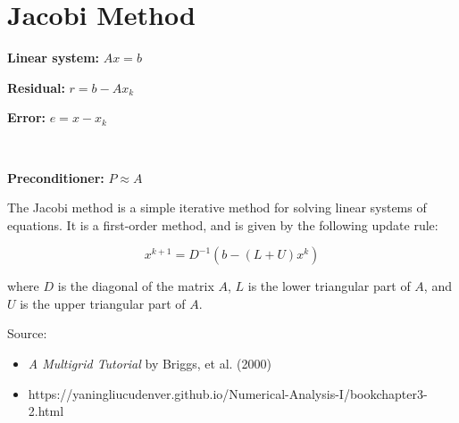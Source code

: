 \documentclass[../main.tex]{subfiles}
\begin{document}
\section{Jacobi Method}
\begin{center}
    \begin{minipage}{0.95\textwidth}
    \raggedright
    \begin{itemize*}[label=\textbullet, itemjoin=\hspace{2em}]
        \item \textbf{Linear system:} $Ax=b$
        \item \textbf{Residual:} $r=b-Ax_k$
        \item \textbf{Error:} $e=x-x_k$
    \end{itemize*} \\
    \vspace{1em}
    \begin{itemize*}[label=\textbullet, itemjoin=\hspace{2em}]
        \item \textbf{Preconditioner:} $P\approx A$
    \end{itemize*}
    \end{minipage}
\end{center}

The Jacobi method is a simple iterative method for solving linear systems of equations. It is a first-order method, and is given by the following update rule:

$$
x^{k+1} = D^{-1} (b - (L + U)x^k)
$$

where $D$ is the diagonal of the matrix $A$, $L$ is the lower triangular part of $A$, and $U$ is the upper triangular part of $A$.

Source: 
\begin{itemize}
    \item \textit{A Multigrid Tutorial} by Briggs, et al. (2000)
    \item https://yaningliucudenver.github.io/Numerical-Analysis-I/bookchapter3-2.html
\end{itemize}
\end{document}
